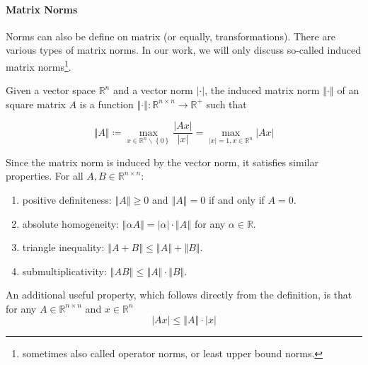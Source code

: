 \documentclass[12pt,English]{article}
\begin{document}
\paragraph{Matrix Norms}\hfill\break
Norms can also be define on matrix (or equally, transformations). There are various types of matrix norms. In our work, we will only discuss so-called induced matrix norms\footnote{sometimes also called operator norms, or least upper bound norms.}.
\begin{defn}
Given a vector space $\mathbb{R}^{n}$ and a vector norm $\left|\cdot\right|$, the induced matrix norm $\left\Vert\cdot\right\Vert$ of an square\footnotemark{} matrix $A$ is a function $\left\Vert\cdot\right\Vert:\mathbb{R}^{n\times n}\rightarrow\mathbb{R}^{+}$ such that

$$
\left\Vert A\right\Vert \coloneqq\max_{x\in\mathbb{R}^{n}\backslash \left\{   0\right\}}\frac{\left|Ax\right|}{\left|x\right|}=\max_{\left|x\right|=1 , x\in\mathbb{R}^{n}}\left|Ax\right|
$$

\end{defn}
Since the matrix norm is induced by the vector norm, it satisfies similar properties. For all $A,B\in\mathbb{R}^{n\times n}$:
\begin{enumerate}
\item positive definiteness: $\left\Vert A\right\Vert\geq0$ and $\left\Vert A\right\Vert=0$
if and only if $A=0$.
\item absolute homogeneity: $\left\Vert\alpha A\right\Vert=\left|\alpha\right|\cdot\left\Vert A\right\Vert$
for any $\alpha\in\mathbb{R}$.
\item triangle inequality: $\left\Vert A+B\right\Vert\leq\left\Vert A\right\Vert+\left\Vert B\right\Vert$.
\item submultiplicativity: $\left\Vert AB \right\Vert\leq\left\Vert A\right\Vert\cdot\left\Vert B \right\Vert$.
\end{enumerate}

An additional useful property, which follows directly from the definition, is that
for any $A\in\mathbb{R}^{n\times n}$ and $x\in\mathbb{R}^{n}$ $$\left|Ax\right|\leq\left\Vert A \right\Vert\cdot\left|x\right|$$
\end{document}
